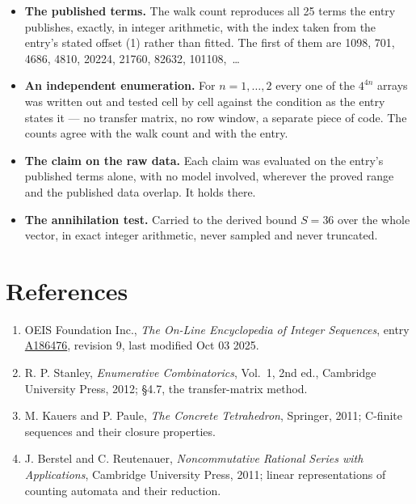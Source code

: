 \documentclass[11pt]{article}
\theoremstyle{definition}
\begin{document}
\begin{itemize}

\item {\bfseries The published terms.} The walk count reproduces all 25 terms the entry publishes, exactly, in integer arithmetic, with the index taken from the entry's stated offset (1) rather than fitted. The first of them are 1098, 701, 4686, 4810, 20224, 21760, 82632, 101108,~\dots

\item {\bfseries An independent enumeration.} For $n = 1,\dots,2$ every one of the $4^{4n}$ arrays was written out and tested cell by cell against the condition as the entry states it --- no transfer matrix, no row window, a separate piece of code. The counts agree with the walk count and with the entry.

\item {\bfseries The claim on the raw data.} Each claim was evaluated on the entry's published terms alone, with no model involved, wherever the proved range and the published data overlap. It holds there.

\item {\bfseries The annihilation test.} Carried to the derived bound $S = 36$ over the whole vector, in exact integer arithmetic, never sampled and never truncated.

\end{itemize}

\section{References}

\begin{enumerate}

\item OEIS Foundation Inc., \emph{The On-Line Encyclopedia of Integer Sequences}, entry \href{https://oeis.org/A186476}{A186476}, revision 9, last modified Oct 03 2025.

\item R. P. Stanley, \emph{Enumerative Combinatorics}, Vol.~1, 2nd ed., Cambridge University Press, 2012; \S4.7, the transfer-matrix method.

\item M. Kauers and P. Paule, \emph{The Concrete Tetrahedron}, Springer, 2011; C-finite sequences and their closure properties.

\item J. Berstel and C. Reutenauer, \emph{Noncommutative Rational Series with Applications}, Cambridge University Press, 2011; linear representations of counting automata and their reduction.

\end{enumerate}
\end{document}
